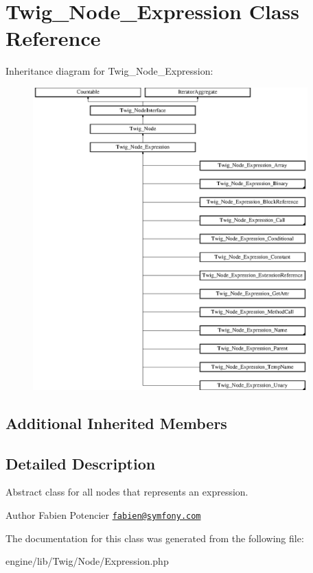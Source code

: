 \hypertarget{class_twig___node___expression}{}\section{Twig\+\_\+\+Node\+\_\+\+Expression Class Reference}
\label{class_twig___node___expression}
Inheritance diagram for Twig\+\_\+\+Node\+\_\+\+Expression\+:\begin{figure}[H]
\begin{center}
\leavevmode
\includegraphics[height=11.666667cm]{class_twig___node___expression}
\end{center}
\end{figure}
\subsection*{Additional Inherited Members}


\subsection{Detailed Description}
Abstract class for all nodes that represents an expression.

\begin{DoxyAuthor}{Author}
Fabien Potencier \href{mailto:fabien@symfony.com}{\tt fabien@symfony.\+com} 
\end{DoxyAuthor}


The documentation for this class was generated from the following file\+:\begin{DoxyCompactItemize}
\item 
engine/lib/\+Twig/\+Node/Expression.\+php\end{DoxyCompactItemize}
